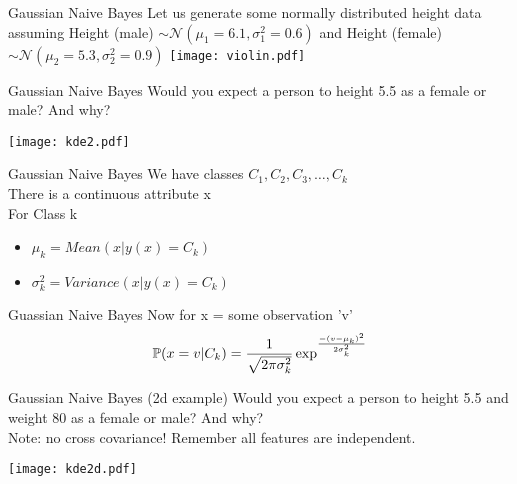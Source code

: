 \documentclass{beamer}
\begin{document}
\begin{frame}{Gaussian Naive Bayes}
    Let us generate some normally distributed height data assuming Height (male) $\sim \mathcal{N}(\mu_1 = 6.1, \sigma_1^2 = 0.6)$
 and Height (female) $\sim \mathcal{N}(\mu_2 = 5.3, \sigma_2^2 = 0.9)$
    \texttt{[image: violin.pdf]}
\end{frame}

\begin{frame}{Gaussian Naive Bayes}
    Would you expect a person to height 5.5 as a female or male? And why? 

    \texttt{[image: kde2.pdf]}
\end{frame}

\begin{frame}{Gaussian Naive Bayes}
    We have classes $C_{1}, C_{2}, C_{3},\dots, C_{k}$\\
    There is a continuous attribute x\\
    For Class k 
    \begin{itemize}
        \item $\mu_{k} = Mean(x \vert y(x) = C_{k})$
        \item $\sigma_{k}^{2} = Variance(x \vert y(x)=C_{k})$
    \end{itemize}
    
\end{frame}

\begin{frame}{Guassian Naive Bayes}
    Now for x = some observation 'v'\\
    \begin{equation*}
        \mathbb{P}(x=v\vert C_{k}) = \frac{1}{\sqrt{2\pi \sigma_{k}^{2}}} \exp^{\frac{-(v-\mu_{k})^{2}}{2\sigma_{k}^{2}}}
    \end{equation*}
\end{frame}

\begin{frame}{Gaussian Naive Bayes (2d example)}
    Would you expect a person to height 5.5 and weight 80 as a female or male? And why? \\
    \pause Note: no cross covariance! Remember all features are independent.

    \texttt{[image: kde2d.pdf]}
\end{frame}
\end{document}
